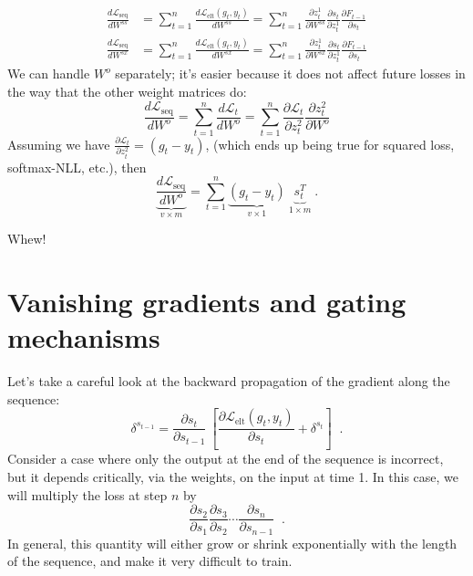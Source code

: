 \begin{enumerate}[(1)]
\begin{align}
  \frac{d \mathcal{L}_\text{seq}}{d W^{ss}} & = \sum_{t=1}^n
  \frac{d \mathcal{L}_\text{elt}(g_t, y_t)}{d W^{ss}} = \sum_{t=1}^n \frac{\partial z_t^1}{\partial W^{ss}} \frac{\partial s_t}{\partial z_t^1} \frac{\partial F_{t - 1}}{\partial s_t} \\
  \frac{d \mathcal{L}_\text{seq}}{d W^{sx}} & =  \sum_{t=1}^n                                                          
 \frac{d \mathcal{L}_\text{elt}(g_t, y_t)}{d W^{sx}} = \sum_{t=1}^n
 \frac{\partial z_t^1}{\partial W^{sx}} \frac{\partial s_t}{\partial z_t^1} \frac{\partial F_{t-1}}{\partial s_t} 
 \end{align}
 We can handle $W^o$ separately;   it's easier because it does not
affect future  losses  in the way that the other weight matrices do:
\begin{equation}
  \frac{d\mathcal{L}_\text{seq}}{d W^o} = \sum_{t = 1}^n\frac{d \mathcal{L}_t}{d W^o} = \sum_{t = 1}^n\frac{\partial \mathcal{L}_t}{\partial
  z_t^2} \frac{\partial z_t^2}{\partial W^o} 
\end{equation} 
Assuming we have $\frac{\partial \mathcal{L}_t}{\partial z_t^2} = (g_t - y_t)$,
(which ends up being true for squared loss, softmax-NLL, etc.), then 
\begin{equation}
  \underbrace{\frac{d \mathcal{L}_\text{seq}}{d W^o}}_{v \times m} = \sum_{t=1}^n \underbrace{(g_t - y_t)}_{v \times 1} ~ \underbrace{s_t^T}_{1 \times m} \; .
\end{equation}

Whew!
\end{enumerate}

\section{Vanishing gradients and gating mechanisms}
\label{lstm}
\label{sec:rnn_lstm}

Let's take a careful look at the backward propagation of the gradient
along the sequence:
\begin{equation}
\delta^{s_{t -1}} = \frac{\partial s_t}{\partial s_{t - 1}} ~
  \left[\frac{\partial \mathcal{L}_\text{elt}(g_t, y_t)}{\partial s_t}
    + \delta^{s_t}\right]\;\;.
\end{equation}
Consider a case where only the output at the end of the sequence is
incorrect, but it depends critically, via the weights,  on the input
at time 1.   In this case, we will multiply the loss at step $n$ by 
\begin{equation}
\frac{\partial s_2}{\partial s_1} \frac{\partial s_3}{\partial
    s_2} \cdots \frac{\partial s_n}{\partial s_{n-1}}\;\;.
\end{equation}
In general, this quantity will either grow or shrink exponentially
with the length of the sequence, and make it very difficult to train.


